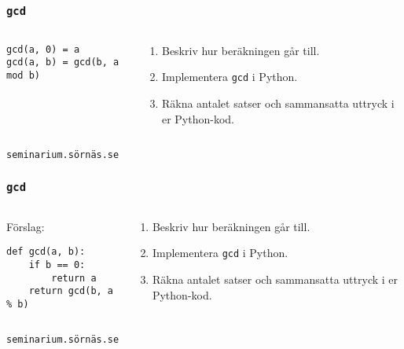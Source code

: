 \documentclass{beamer}
\begin{document}
  \begin{frame}[fragile]
    \frametitle{\texttt{gcd}}
    \begin{columns}
      \begin{column}{0.48\textwidth}
        \begin{verbatim}
gcd(a, 0) = a
gcd(a, b) = gcd(b, a mod b)
        \end{verbatim}
      \end{column}%
      \begin{column}{0.48\textwidth}
        \begin{enumerate}
          \item Beskriv hur beräkningen går till.
          \item Implementera \texttt{gcd} i Python.
          \item Räkna antalet satser och sammansatta uttryck i er Python-kod.
        \end{enumerate}
      \end{column}%
    \end{columns}

    \vfill{}
    \hfill{} \texttt{seminarium.sörnäs.se} \\
  \end{frame}

  \begin{frame}[fragile]
    \frametitle{\texttt{gcd}}

    \begin{columns}
      \begin{column}{0.48\textwidth}
        Förslag:
        \begin{verbatim}
def gcd(a, b):
    if b == 0:
        return a
    return gcd(b, a % b)
        \end{verbatim}
      \end{column}%
      \begin{column}{0.48\textwidth}
        \begin{enumerate}
          \item Beskriv hur beräkningen går till.
          \item Implementera \texttt{gcd} i Python.
          \item Räkna antalet satser och sammansatta uttryck i er Python-kod.
        \end{enumerate}
      \end{column}%
    \end{columns}

    \vfill{}
    \hfill{} \texttt{seminarium.sörnäs.se} \\
  \end{frame}
\end{document}
